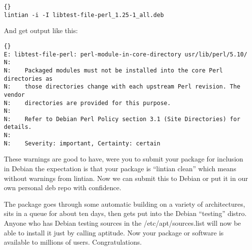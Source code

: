\begin{lstlisting}[frame=trbl,label=cl:debs_cpan:lintian-command,caption=lintian command]{}
lintian -i -I libtest-file-perl_1.25-1_all.deb 
\end{lstlisting}

And get output like this:

\begin{lstlisting}[frame=trbl,label=cl:debs_cpan:lintian-output,caption=lintian output]{}
E: libtest-file-perl: perl-module-in-core-directory usr/lib/perl/5.10/
N: 
N:    Packaged modules must not be installed into the core Perl directories as
N:    those directories change with each upstream Perl revision. The vendor
N:    directories are provided for this purpose.
N:    
N:    Refer to Debian Perl Policy section 3.1 (Site Directories) for details.
N:    
N:    Severity: important, Certainty: certain
\end{lstlisting}\cite{debs_cpan-debian_perl_policy}

These warnings are good to have, were you to submit your package for inclusion
in Debian the expectation is that your package is ``lintian clean'' which means
without warnings from lintian. Now we can submit this to Debian or put it in our
own personal deb repo with conf\hbox{}idence.

The package goes through some automatic building on a variety of architectures,
sits in a queue for about ten days, then gets put into the Debian ``testing''
distro. Anyone who has Debian testing sources in the /etc/apt/sources.list will
now be able to install it just by calling aptitude. Now your package or software
is available to millions of users. Congratulations.
